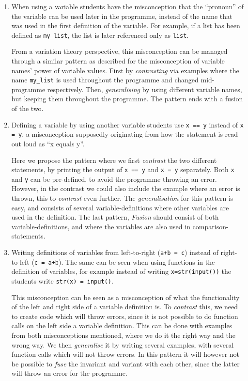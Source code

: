 \begin{enumerate}
    \item When using a variable students have the misconception that the 
      \enquote{pronoun} of the variable can be used later in the programme, 
      instead of the name that was used in the first definition of the 
      variable. For example, if a list has been defined as 
      \texttt{my_list}, the list is later referenced only as 
      \texttt{list}.

      From a variation theory perspective, this misconception can be 
managed through a similar pattern as described for the misconception 
of variable names' power of variable values. First by \emph{
contrasting} via examples where the name \texttt{my_list} 
is used throughout the programme and changed mid-programme 
respectively. Then, \emph{generalising} by using different variable 
names, but keeping them throughout the programme. The pattern ends 
with a fusion of the two.
    \item Defining a variable by using another variable students use 
      \texttt{x == y} instead of \texttt{x = y}, a 
      misconception supposedly originating from how the statement is read 
out 
      loud as \enquote{x equals y}.

      Here we propose the pattern where we first \emph{contrast} the two 
different statements, by printing the output of \texttt{x 
== y} and \texttt{x = y} separately. Both \texttt{x} and \texttt{y} can be pre-defined, to avoid 
the programme throwing an error. However, in the contrast we could 
also include the example where an error is thrown, this to \emph{
contrast} even further. The \emph{generalisation} for this pattern is 
easy, and consists of several variable-definitions where other 
variables are used in the definition. The last pattern, \emph{Fusion} 
should consist of both variable-definitions, and where the variables 
are also used in comparison-statements. 
    \item Writing definitions of variables from left-to-right 
      (\texttt{a+b = c}) instead of right-to-left 
      (\texttt{c = a+b}). The same can be seen when using 
functions 
      in the definition of variables, for example instead of writing 
      \texttt{x=str(input())} the students write 
      \texttt{str(x) = input()}.

      This misconception can be seen as a misconception of what the 
functionality of the left and right side of a variable definition is. 
To \emph{contrast} this, we need to create code which will throw 
errors, since it is not possible to do function calls on the left 
side a variable definition. This can be done with examples from both 
misconceptions mentioned, where we do it the right way and the wrong 
way. We then \emph{generalise} it by writing several examples, with 
several function calls which will not throw errors. In this pattern 
it will however not be possible to \emph{fuse} the invariant and 
variant with each other, since the latter will throw an error for the 
programme. 
\end{enumerate}


